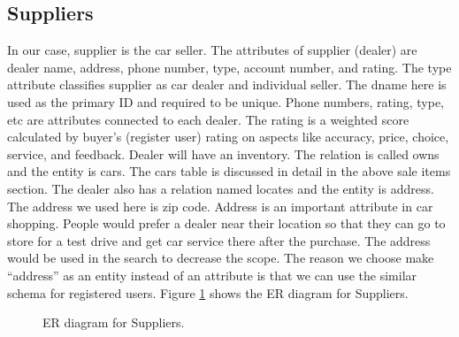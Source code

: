 \documentclass[12pt]{article}
\begin{document}
\subsection{Suppliers}
In our case, supplier is the car seller. The attributes of supplier (dealer) are dealer name, address, phone number, type, account number, and rating. The type attribute classifies supplier as car dealer and individual seller. The dname here is used as the primary ID and required to be unique. Phone numbers, rating, type, etc are attributes connected to each dealer. The rating is a weighted score calculated by buyer's (register user) rating on aspects like accuracy, price, choice, service, and feedback. Dealer will have an inventory. The relation is called owns and the entity is cars. The cars table is discussed in detail in the above sale items section. The dealer also has a relation named locates and the entity is address. The address we used here is zip code. Address is an important attribute in car shopping. People would prefer a dealer near their location so that they can go to store for a test drive and get car service there after the purchase. The address would be used in the search to decrease the scope. The reason we choose make ``address'' as an entity instead of an attribute is that we can use the similar schema for registered users. Figure \ref{ERSupp} shows the ER diagram for Suppliers.
\begin{figure}[!h]
\caption{ER diagram for Suppliers.\label{ERSupp}}
\begin{center}
\end{center}
\end{figure}
\end{document}
